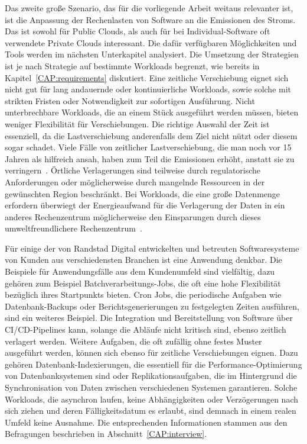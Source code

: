Das zweite große Szenario, das für die vorliegende Arbeit weitaus relevanter ist, ist die Anpassung der Rechenlasten von Software an die Emissionen des Stroms.
Das ist sowohl für Public Clouds, als auch für bei Individual-Software oft verwendete Private Clouds interessant.
Die dafür verfügbaren Möglichkeiten und Tools werden im nächsten Unterkapitel analysiert.
Die Umsetzung der Strategien ist je nach Strategie auf bestimmte Workloads begrenzt, wie bereits in Kapitel~\ref{CAP:requirements} diskutiert.
Eine zeitliche Verschiebung eignet sich nicht gut für lang andauernde oder kontinuierliche Workloads, sowie solche mit strikten Fristen oder Notwendigkeit zur sofortigen Ausführung.
Nicht unterbrechbare Workloads, die an einem Stück ausgeführt werden müssen, bieten weniger Flexibilität für Verschiebungen.
Die richtige Auswahl der Zeit ist essenziell, da die Lastverschiebung anderenfalls dem Ziel nicht nützt oder diesem sogar schadet.
Viele Fälle von zeitlicher Lastverschiebung, die man noch vor 15 Jahren als hilfreich ansah, haben zum Teil die Emissionen erhöht, anstatt sie zu verringern~\cite{WattTime.12.3.2024}.
Örtliche Verlagerungen sind teilweise durch regulatorische Anforderungen oder möglicherweise durch mangelnde Ressourcen in der gewünschten Region beschränkt.
Bei Workloads, die eine große Datenmenge erfordern überwiegt der Energieaufwand für die Verlagerung der Daten in ein anderes Rechenzentrum möglicherweise den Einsparungen durch dieses umweltfreundlichere Rechenzentrum~\cite{Norlander.2023}.

Für einige der von Randstad Digital entwickelten und betreuten Softwaresysteme von Kunden aus verschiedensten Branchen ist eine Anwendung denkbar.
Die Beispiele für Anwendungsfälle aus dem Kundenumfeld sind vielfältig, dazu gehören zum Beispiel Batchverarbeitungs-Jobs, die oft eine hohe Flexibilität bezüglich ihres Startpunkts bieten.
Cron Jobs, die periodische Aufgaben wie Datenbank-Backups oder Berichtsgenerierungen zu festgelegten Zeiten ausführen, sind ein weiteres Beispiel.
Die Integration und Bereitstellung von Software über CI/CD-Pipelines kann, solange die Abläufe nicht kritisch sind, ebenso zeitlich verlagert werden.
Weitere Aufgaben, die oft zufällig ohne festes Muster ausgeführt werden, können sich ebenso für zeitliche Verschiebungen eignen.
Dazu gehören Datenbank-Indexierungen, die essentiell für die Performance-Optimierung von Datenbanksystemen sind oder Replikationsaufgaben, die im Hintergrund die Synchronisation von Daten zwischen verschiedenen Systemen garantieren.
Solche Workloads, die asynchron laufen, keine Abhängigkeiten oder Verzögerungen nach sich ziehen und deren Fälligkeitsdatum es erlaubt, sind demnach in einem realen Umfeld keine Ausnahme.
Die entsprechenden Informationen stammen aus den Befragungen beschrieben in Abschnitt~\ref{CAP:interview}.

